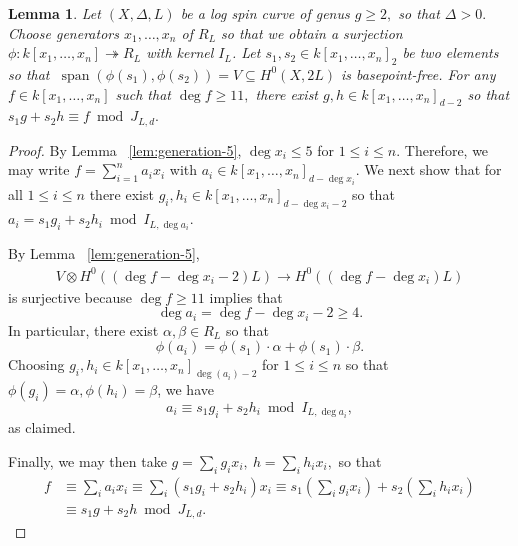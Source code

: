 \documentclass{amsart}
\theoremstyle{plain}
\newtheorem{lem}[thm]{Lemma}
\theoremstyle{definition}
\theoremstyle{remark}
\numberwithin{equation}{section}
\newcommand{\halfcan}{L}
\DeclareMathOperator{\newspan}{span}
\begin{document}
\begin{lem}
\label{lem:reducing-degree}
Let $(X, \Delta, \halfcan)$ be a log spin curve of genus $g \geq 2,$ so
that $\Delta > 0.$ Choose generators $x_1, \ldots, x_n$ of $R_\halfcan$ so
that we obtain a surjection $\phi: k[x_1, \ldots, x_n]
\twoheadrightarrow R_\halfcan$ with kernel $I_L$. Let $s_1, s_2 \in k[x_1,
\ldots, x_n]_2$ be two elements so that $\: \newspan(\phi(s_1), \phi(s_2))
= V \subseteq H^0(X, 2\halfcan)$ is basepoint-free. For any $f \in
k[x_1, \ldots, x_n]$ such that $\deg f \geq 11,$ there exist $g, h \in
k[x_1, \ldots, x_n]_{d - 2}$ so that $s_1 g + s_2 h \equiv f \bmod J_{\halfcan, d}.$
\end{lem}
\begin{proof}
By Lemma ~\ref{lem:generation-5}, $\deg x_i \leq 5$ for $1 \leq i \leq n$. Therefore, we may write $f = \sum_{i = 1}^{n}a_i x_i$ with $a_i \in k[x_1, \ldots, x_n]_{d-\deg x_i}$.
We next show that for all $1 \leq i \leq n$ there exist $g_i, h_i \in k[x_1, \ldots, x_n]_{d - \deg x_i - 2}$ so that $a_i = s_1g_i + s_2h_i \bmod I_{\halfcan,\deg a_i}.$ 

By Lemma ~\ref{lem:generation-5},
\begin{align*}
	V \otimes H^0((\deg f-\deg x_i -2)\halfcan) \rightarrow H^0((\deg f-\deg x_i)\halfcan)
\end{align*}
is surjective because $\deg f \geq 11$ implies that
$$\deg a_i =\deg f - \deg x_i -2 \geq 4.$$
In particular, there exist $\alpha,\beta \in R_L$ so that
$$\phi(a_i) = \phi(s_1) \cdot \alpha + \phi(s_1) \cdot \beta.$$ 
Choosing $g_i,h_i\in k[x_1, \ldots, x_n]_{\deg(a_i)-2}$ for $1 \leq i \leq n$ so that $\phi(g_i) = \alpha, \phi(h_i) = \beta$, we have 
$$a_i \equiv s_1 g_i + s_2 h_i \bmod I_{\halfcan,\deg a_i},$$ as claimed.

Finally, we may then take $g = \sum_{i}^{}g_i x_i, \: h = \sum_{i}^{}h_i x_i,$ so that 
\begin{align*}
	f &\equiv \sum_{i}^{}a_i x_i \equiv \sum_{i}^{}(s_1g_i + s_2h_i)x_i \equiv s_1 \left( \sum_{i}^{}g_i x_i \right) + s_2 \left( \sum_{i}^{}h_i x_i \right) \\
	&\equiv s_1 g + s_2 h \bmod J_{L,d}.
\end{align*}
\end{proof}
\end{document}
